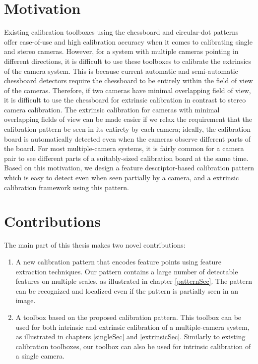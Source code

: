 \documentclass{report}
\begin{document}
\section{Motivation}
\label{motiveSec}
Existing calibration toolboxes using the chessboard and circular-dot patterns offer ease-of-use and high calibration accuracy when it comes to calibrating single and stereo cameras. However, for a system with multiple cameras pointing in different directions, it is difficult to use these toolboxes to calibrate the extrinsics of the camera system. This is because current automatic and semi-automatic chessboard detectors require the chessboard to be entirely within the field of view of the cameras. Therefore, if two cameras have minimal overlapping field of view, it is difficult to use the chessboard for extrinsic calibration in contrast to stereo camera calibration. The extrinsic calibration for cameras with minimal overlapping fields of view can be made easier if we relax the requirement that the calibration pattern be seen in its entirety by each camera; ideally, the calibration board is automatically detected even when the cameras observe different parts of the board. For most multiple-camera systems, it is fairly common for a camera pair to see different parts of a suitably-sized calibration board at the same time. Based on this motivation, we design a feature descriptor-based calibration pattern which is easy to detect even when seen partially by a camera, and a extrinsic calibration framework using this pattern. 



\section{Contributions}

The main part of this thesis makes two novel contributions: 

\begin{enumerate}
\item A new calibration pattern that encodes feature points using feature extraction techniques. Our pattern contains a large number of detectable features on multiple scales, as illustrated in chapter \ref{patternSec}. The pattern can be recognized and localized even if the pattern is partially seen in an image. 
\item A toolbox based on the proposed calibration pattern. This toolbox can be used for both intrinsic and extrinsic calibration of a multiple-camera system, as illustrated in chapters \ref{singleSec} and \ref{extrinsicSec}. Similarly to existing calibration toolboxes, our toolbox can also be used for intrinsic calibration of a single camera. 
\end{enumerate}
\end{document}
